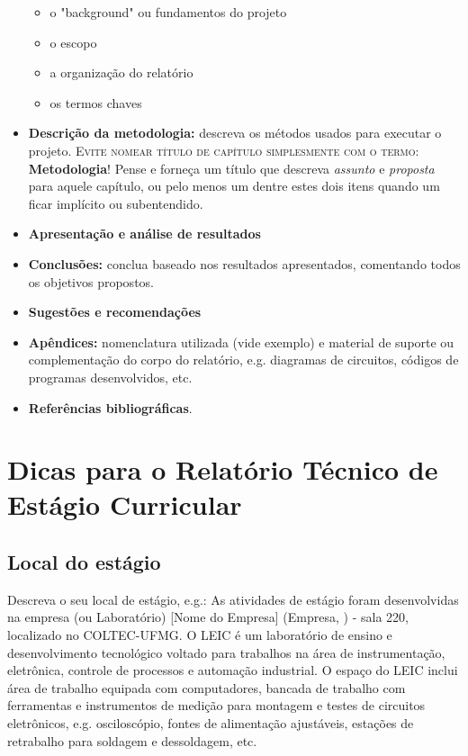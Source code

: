 \begin{itemize}
\begin{itemize}
  	\item o "background" ou fundamentos do projeto
  	\item o escopo
  	\item a organização do relatório
 	 \item os termos chaves
  \end{itemize}
	
  \item {\bf Descrição da metodologia:} descreva os métodos usados para executar o projeto. {\color{red!50!gray}\textsc{Evite nomear  título de capítulo simplesmente com o termo: }} \textbf{Metodologia}! Pense e forneça um título que descreva \emph{assunto} e \emph{proposta} para aquele capítulo, ou pelo menos um dentre estes dois itens quando um ficar implícito ou subentendido.
  
  \item {\bf Apresentação e análise de resultados}
  \item {\bf Conclusões:} conclua baseado nos resultados apresentados, comentando todos os objetivos propostos.
  \item {\bf Sugestões e recomendações}
  \item {\bf Apêndices:} nomenclatura utilizada (vide exemplo) e material de suporte ou complementação do corpo do relatório, e.g. diagramas de circuitos, códigos de programas desenvolvidos, etc.
  \item {\bf Referências bibliográficas}.
\end{itemize}


\section{Dicas para o Relatório Técnico de Estágio Curricular}

\subsection{Local do estágio}
Descreva o seu local de estágio, e.g.:
As atividades de estágio foram  desenvolvidas na empresa (ou Laboratório) [Nome do Empresa] (Empresa, ) - sala 220, localizado no COLTEC-UFMG.  
O LEIC é um laboratório de ensino e desenvolvimento tecnológico voltado para trabalhos na área de instrumentação, eletrônica, controle de processos e automação industrial. O espaço do LEIC inclui área de trabalho equipada com computadores, bancada de trabalho com ferramentas e instrumentos de medição para montagem e testes de circuitos eletrônicos, e.g. osciloscópio, fontes de alimentação ajustáveis, estações de retrabalho para soldagem e dessoldagem, etc.

